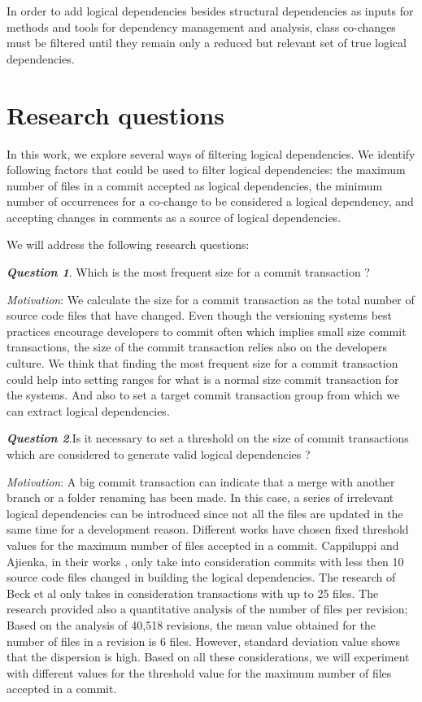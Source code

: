 \documentclass[a4paper,twoside]{article}
\begin{document}
In order to add logical dependencies besides structural dependencies as inputs for methods and tools for dependency management and analysis, class co-changes must be filtered until they remain only a reduced but relevant set of true logical dependencies. 


\section{Research questions}
\label{sec:question}

In this work, we explore several ways of filtering logical dependencies.  We identify following factors that could be used to filter logical dependencies: the maximum number of files in a commit accepted as logical dependencies, the minimum number of occurrences for a co-change to be considered a logical dependency, and accepting changes in comments as a source of logical dependencies. 

We will address the following research questions:

\textit{\textbf{Question 1}}. Which is the most frequent size for a commit transaction ?  

\textit{Motivation}: We calculate the size for a commit transaction as the total number of source code files that have changed. Even though the versioning systems best practices encourage developers to commit often which implies small size commit transactions, the size of the commit transaction relies also on the developers culture. We think that finding the most frequent size for a commit transaction could help into setting ranges for what is a normal size commit transaction for the systems. And also to set a target commit transaction group from which we can extract logical dependencies.

\textit{\textbf{Question 2}}.Is it necessary to set a threshold on the size of commit transactions which are considered to generate valid logical dependencies ?

\textit{Motivation}: A big commit transaction can indicate that a merge with another branch or a folder renaming has been made. In this case, a series of irrelevant logical dependencies can be introduced since not all the files are updated in the same time for a development reason. Different works have chosen fixed threshold values for the maximum number of files accepted in a commit. Cappiluppi and Ajienka, in their works \cite{DBLP:journals/jss/AjienkaC17}, \cite{DBLP:journals/ese/AjienkaCC18} only take into consideration commits with less then 10 source code files changed in building the logical dependencies. The research of Beck et al \cite{Beck:2011:CMC:2025113.2025162} only takes in consideration transactions with up to 25 files. The research \cite{Oliva:2011:ISL:2067853.2068086} provided also a quantitative analysis of the number of files per revision; Based on the analysis of  40,518 revisions, the mean value obtained for the number of files in a revision is 6 files. However, standard deviation value shows that the dispersion is high. Based on all these considerations, we will experiment with different values for the threshold value for the maximum number of files accepted in a commit. 
\end{document}
